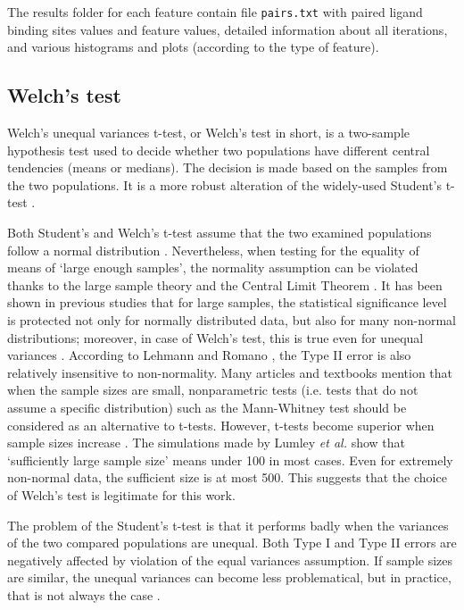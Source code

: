 The results folder for each feature contain file \texttt{pairs.txt} with paired ligand binding sites values and feature values, detailed information about all iterations, and various histograms and plots (according to the type of feature). 


\subsection{Welch's test} \label{s:welchs}

Welch's unequal variances t-test, or Welch's test in short, is a two-sample hypothesis test used to decide whether two populations have different central tendencies (means or medians). The decision is made based on the samples from the two populations. It is a more robust alteration of the widely-used Student's t-test \cite{welch}.

Both Student's and Welch's t-test assume that the two examined populations follow a normal distribution \cite{welch}. Nevertheless, when testing for the equality of means of `large enough samples', the normality assumption can be violated thanks to the large sample theory and the Central Limit Theorem \cite{lehmann}. It has been shown in previous studies that for large samples, the statistical significance level is protected not only for normally distributed data, but also for many non-normal distributions; moreover, in case of Welch's test, this is true even for unequal variances \cite{zimmerman_zumbo_1993, zumbo_coulombe_1997, lumley}. According to  Lehmann and Romano \cite{lehmann}, the Type II error is also relatively insensitive to non-normality. Many articles and textbooks mention that when the sample sizes are small, nonparametric tests (i.e. tests that do not assume a specific distribution) such as the Mann-Whitney test \cite{mann} should be considered as an alternative to t-tests.
However, t-tests become superior when sample sizes increase \cite{zimmerman1998, lumley}. The simulations made by Lumley \textit{et al.} \cite{lumley} show that `sufficiently large sample size' means under 100 in most cases. Even for extremely non-normal data, the sufficient size is at most 500. This suggests that the choice of Welch's test is legitimate for this work.

The problem of the Student's t-test is that it performs badly when the variances of the two compared populations are unequal. Both Type I and Type II errors are negatively affected by violation of the equal variances assumption. If sample sizes are similar, the unequal variances can become less problematical, but in practice, that is not always the case \cite{ruxton}.

